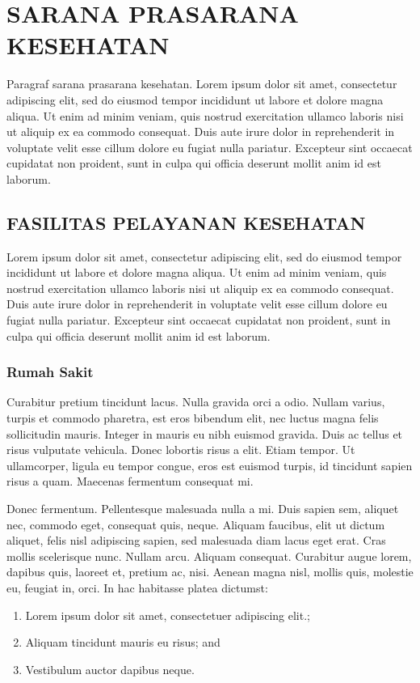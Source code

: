 \chapter{SARANA PRASARANA KESEHATAN}
Paragraf sarana prasarana kesehatan. Lorem ipsum dolor sit amet, consectetur adipiscing elit, sed do eiusmod tempor incididunt ut labore et dolore magna aliqua. Ut enim ad minim veniam, quis nostrud exercitation ullamco laboris nisi ut aliquip ex ea commodo consequat. Duis aute irure dolor in reprehenderit in voluptate velit esse cillum dolore eu fugiat nulla pariatur. Excepteur sint occaecat cupidatat non proident, sunt in culpa qui officia deserunt mollit anim id est laborum.

\section{FASILITAS PELAYANAN KESEHATAN}
Lorem ipsum dolor sit amet, consectetur adipiscing elit, sed do eiusmod tempor incididunt ut labore et dolore magna aliqua. Ut enim ad minim veniam, quis nostrud exercitation ullamco laboris nisi ut aliquip ex ea commodo consequat. Duis aute irure dolor in reprehenderit in voluptate velit esse cillum dolore eu fugiat nulla pariatur. Excepteur sint occaecat cupidatat non proident, sunt in culpa qui officia deserunt mollit anim id est laborum.

\subsection{Rumah Sakit}
Curabitur pretium tincidunt lacus. Nulla gravida orci a odio. Nullam varius, turpis et commodo pharetra, est eros bibendum elit, nec luctus magna felis sollicitudin mauris. Integer in mauris eu nibh euismod gravida. Duis ac tellus et risus vulputate vehicula. Donec lobortis risus a elit. Etiam tempor. Ut ullamcorper, ligula eu tempor congue, eros est euismod turpis, id tincidunt sapien risus a quam. Maecenas fermentum consequat mi. 

Donec fermentum. Pellentesque malesuada nulla a mi. Duis sapien sem, aliquet nec, commodo eget, consequat quis, neque. Aliquam faucibus, elit ut dictum aliquet, felis nisl adipiscing sapien, sed malesuada diam lacus eget erat. Cras mollis scelerisque nunc. Nullam arcu. Aliquam consequat. Curabitur augue lorem, dapibus quis, laoreet et, pretium ac, nisi. Aenean magna nisl, mollis quis, molestie eu, feugiat in, orci. In hac habitasse platea dictumst:
\begin{enumerate}
  \item Lorem ipsum dolor sit amet, consectetuer adipiscing elit.;
  \item Aliquam tincidunt mauris eu risus; and
  \item Vestibulum auctor dapibus neque.
\end{enumerate}

